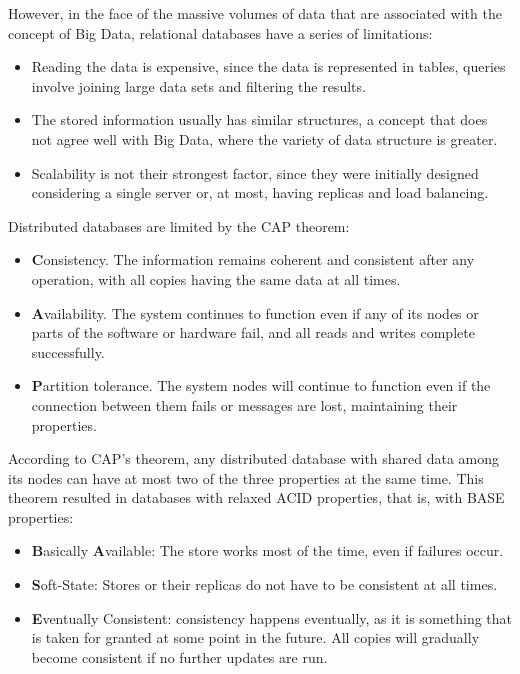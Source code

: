 \nonzeroparskip However, in the face of the massive volumes of data that are associated with the concept of Big Data, relational databases have a series of limitations:
\begin{itemize}
	\item Reading the data is expensive, since the data is represented in tables, queries involve joining large data sets and filtering the results.
	\item The stored information usually has similar structures, a concept that does not agree well with Big Data, where the variety of data structure is greater.
	\item Scalability is not their strongest factor, since they were initially designed considering a single server or, at most, having replicas and load balancing.
\end{itemize}

\nonzeroparskip Distributed databases are limited by the CAP theorem:
\begin{itemize}
	\item \textbf{C}onsistency. The information remains coherent and consistent after any operation, with all copies having the same data at all times.
	\item \textbf{A}vailability. The system continues to function even if any of its nodes or parts of the software or hardware fail, and all reads and writes complete successfully.
	\item \textbf{P}artition tolerance. The system nodes will continue to function even if the connection between them fails or messages are lost, maintaining their properties.
\end{itemize}

\nonzeroparskip According to CAP's theorem, any distributed database with shared data among its nodes can have at most two of the three properties at the same time. This theorem resulted in databases with relaxed ACID properties, that is, with BASE properties:
\begin{itemize}
	\item \textbf{B}asically \textbf{A}vailable: The store works most of the time, even if failures occur.
	\item \textbf{S}oft-State: Stores or their replicas do not have to be consistent at all times.
	\item \textbf{E}ventually Consistent: consistency happens eventually, as it is something that is taken for granted at some point in the future. All copies will gradually become consistent if no further updates are run.
\end{itemize}

